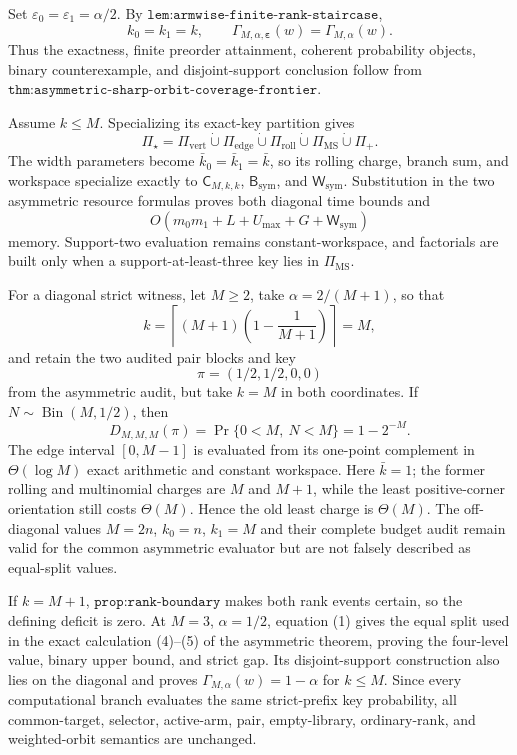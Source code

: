 Set \(\varepsilon_0=\varepsilon_1=\alpha/2\). By \(\texttt{lem:armwise-finite-rank-staircase}\),
\[
k_0=k_1=k,
\qquad
\Gamma_{M,\alpha,\boldsymbol\varepsilon}(w)=\Gamma_{M,\alpha}(w).
\tag{1}
\]
Thus the exactness, finite preorder attainment, coherent probability objects, binary counterexample, and disjoint-support conclusion follow from \(\texttt{thm:asymmetric-sharp-orbit-coverage-frontier}\).

Assume \(k\le M\). Specializing its exact-key partition gives
\[
\Pi_\star=\Pi_{\mathrm{vert}}\mathbin{\dot\cup}\Pi_{\mathrm{edge}}
\mathbin{\dot\cup}\Pi_{\mathrm{roll}}\mathbin{\dot\cup}
\Pi_{\mathrm{MS}}\mathbin{\dot\cup}\Pi_+.
\tag{2}
\]
The width parameters become \(\bar k_0=\bar k_1=\bar k\), so its rolling charge, branch sum, and workspace specialize exactly to \(\mathsf C_{M,k,k}\), \(\mathsf B_{\mathrm{sym}}\), and \(\mathsf W_{\mathrm{sym}}\). Substitution in the two asymmetric resource formulas proves both diagonal time bounds and
\[
O(m_0m_1+L+U_{\max}+G+\mathsf W_{\mathrm{sym}})
\]
memory. Support-two evaluation remains constant-workspace, and factorials are built only when a support-at-least-three key lies in \(\Pi_{\mathrm{MS}}\).

For a diagonal strict witness, let \(M\ge2\), take \(\alpha=2/(M+1)\), so that
\[
k=\left\lceil(M+1)\left(1-\frac1{M+1}\right)\right\rceil=M,
\]
and retain the two audited pair blocks and key
\[
\pi=(1/2,1/2,0,0)
\]
from the asymmetric audit, but take \(k=M\) in both coordinates. If \(N\sim\operatorname{Bin}(M,1/2)\), then
\[
D_{M,M,M}(\pi)=\Pr\{0<M,\ N<M\}=1-2^{-M}.
\tag{3}
\]
The edge interval \([0,M-1]\) is evaluated from its one-point complement in \(\Theta(\log M)\) exact arithmetic and constant workspace. Here \(\bar k=1\); the former rolling and multinomial charges are \(M\) and \(M+1\), while the least positive-corner orientation still costs \(\Theta(M)\). Hence the old least charge is \(\Theta(M)\). The off-diagonal values \(M=2n\), \(k_0=n\), \(k_1=M\) and their complete budget audit remain valid for the common asymmetric evaluator but are not falsely described as equal-split values.

If \(k=M+1\), \(\texttt{prop:rank-boundary}\) makes both rank events certain, so the defining deficit is zero. At \(M=3\), \(\alpha=1/2\), equation (1) gives the equal split used in the exact calculation (4)--(5) of the asymmetric theorem, proving the four-level value, binary upper bound, and strict gap. Its disjoint-support construction also lies on the diagonal and proves \(\Gamma_{M,\alpha}(w)=1-\alpha\) for \(k\le M\). Since every computational branch evaluates the same strict-prefix key probability, all common-target, selector, active-arm, pair, empty-library, ordinary-rank, and weighted-orbit semantics are unchanged.
